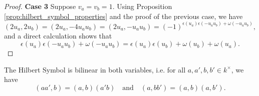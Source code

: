 \begin{proof}
		\noindent\textbf{Case 3} Suppose $v_a=v_b=1$. Using Proposition \ref{prop:hilbert_symbol_properties} and the proof
		of the previous case, we have
		\[
		(2u_a,2u_b)=(2u_a,-4u_au_b)=(2u_a,-u_au_b)=(-1)^{\epsilon(u_a)\epsilon(-u_au_b)+\omega(-u_au_b)},
		\]
		and a direct calculation shows that
		\[
		\epsilon(u_a)\epsilon(-u_au_b)+\omega(-u_au_b) = \epsilon(u_a)\epsilon(u_b) + \omega(u_b) + \omega(u_a).
		\]
\end{proof}

\begin{theorem}
		\label{thm:bilinear}
		\leanok
The Hilbert Symbol is bilinear in both variables, i.e. for all $a, a', b, b' \in k^\times$, we have
\[
(aa',b)=(a,b)(a'b) \quad \text{and} \quad (a,bb')=(a,b)(a,b').
\]
\end{theorem}


